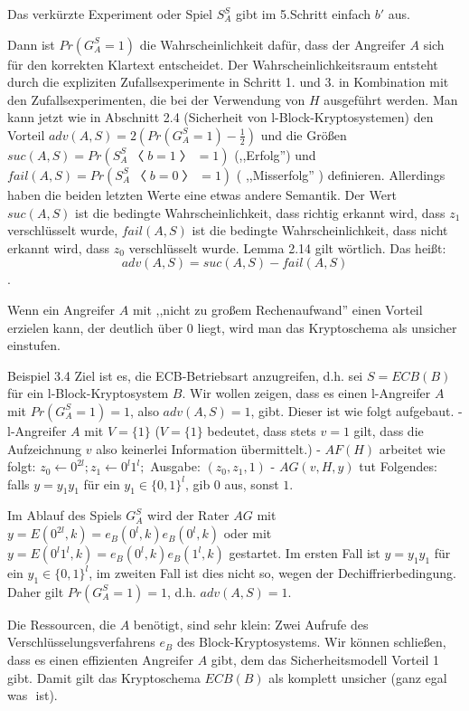 \documentclass[a4paper]{article}
\begin{document}
\begin{multicols}{3}
        Das verkürzte Experiment oder Spiel $S^S_A$ gibt im 5.Schritt einfach $b′$ aus.

        Dann ist  $Pr(G^S_A = 1)$ die Wahrscheinlichkeit dafür, dass der Angreifer $A$ sich für den korrekten Klartext entscheidet. Der Wahrscheinlichkeitsraum entsteht durch die expliziten Zufallsexperimente in Schritt 1. und 3. in Kombination mit den Zufallsexperimenten, die bei der Verwendung von $H$ ausgeführt werden. Man kann jetzt wie in Abschnitt 2.4 (Sicherheit von l-Block-Kryptosystemen) den Vorteil $adv(A,S) = 2(Pr(G^S_A= 1)-\frac{1}{2})$ und die Größen $suc(A,S) = Pr(S^S_A〈b= 1〉= 1)$ (,,Erfolg'') und $fail(A,S) = Pr(S_A^S〈b= 0〉= 1)$ ( ,,Misserfolg'' ) definieren. Allerdings haben die beiden letzten Werte eine etwas andere Semantik. Der Wert $suc(A,S)$ ist die bedingte Wahrscheinlichkeit, dass richtig erkannt wird, dass $z_1$ verschlüsselt wurde, $fail(A,S)$ ist die bedingte Wahrscheinlichkeit, dass nicht erkannt wird, dass $z_0$ verschlüsselt wurde. Lemma 2.14 gilt wörtlich. Das heißt: $$adv(A,S) = suc(A,S)-fail(A,S)$$.

        Wenn ein Angreifer $A$ mit ,,nicht zu großem Rechenaufwand'' einen Vorteil erzielen kann, der deutlich über $0$ liegt, wird man das Kryptoschema als unsicher einstufen.

        Beispiel 3.4 Ziel ist es, die ECB-Betriebsart anzugreifen, d.h. sei $S=ECB(B)$ für ein l-Block-Kryptosystem $B$. Wir wollen zeigen, dass es einen l-Angreifer $A$ mit $Pr(G^S_A= 1) = 1$, also $adv(A,S) = 1$, gibt. Dieser ist wie folgt aufgebaut.
        - l-Angreifer $A$ mit $V=\{1\}$ ($V=\{1\}$ bedeutet, dass stets $v=1$ gilt, dass die Aufzeichnung $v$ also keinerlei Information übermittelt.)
        - $AF(H)$ arbeitet wie folgt: $z_0\leftarrow 0^{2l}; z_1\leftarrow 0^l 1^l;$ Ausgabe: $(z_0,z_1 ,1)$
        - $AG(v,H,y)$ tut Folgendes: falls $y=y_1y_1$ für ein $y_1\in\{0,1\}^l$, gib $0$ aus, sonst $1$.

        Im Ablauf des Spiels $G^S_A$ wird der Rater $AG$ mit $y=E(0^{2l},k)=e_B(0^l,k)e_B(0^l,k)$ oder mit $y=E(0^l 1^l,k)=e_B(0^l,k)e_B(1^l,k)$ gestartet. Im ersten Fall ist $y=y_1y_1$ für ein $y_1\in\{0,1\}^l$, im zweiten Fall ist dies nicht so, wegen der Dechiffrierbedingung. Daher gilt $Pr(G^S_A= 1) = 1$, d.h. $adv(A,S) = 1$.

        Die Ressourcen, die $A$ benötigt, sind sehr klein: Zwei Aufrufe des Verschlüsselungsverfahrens $e_B$ des Block-Kryptosystems. Wir können schließen, dass es einen effizienten Angreifer $A$ gibt, dem das Sicherheitsmodell Vorteil 1 gibt. Damit gilt das Kryptoschema $ECB(B)$ als komplett unsicher (ganz egal was $$ ist).


\end{multicols}
\end{document}
